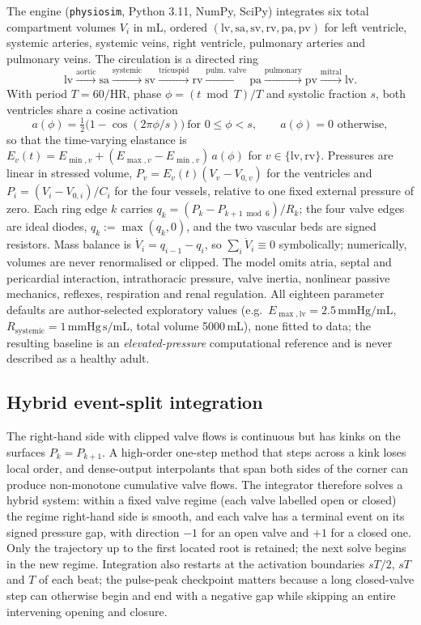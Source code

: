 \documentclass[11pt,letterpaper]{article}
\newcommand{\pkg}[1]{\texttt{#1}}
\newcommand{\mmHg}{\mathrm{mmHg}}
\newcommand{\mL}{\mathrm{mL}}
\begin{document}
The engine (\pkg{physiosim}, Python 3.11, NumPy, SciPy) integrates six total compartment volumes $V_i$ in mL, ordered $(\mathrm{lv},\mathrm{sa},\mathrm{sv},\mathrm{rv},\mathrm{pa},\mathrm{pv})$ for left ventricle, systemic arteries, systemic veins, right ventricle, pulmonary arteries and pulmonary veins. The circulation is a directed ring
\[
\mathrm{lv}\xrightarrow{\text{aortic}}\mathrm{sa}\xrightarrow{\text{systemic}}\mathrm{sv}\xrightarrow{\text{tricuspid}}\mathrm{rv}\xrightarrow{\text{pulm.\ valve}}\mathrm{pa}\xrightarrow{\text{pulmonary}}\mathrm{pv}\xrightarrow{\text{mitral}}\mathrm{lv}.
\]
With period $T=60/\mathrm{HR}$, phase $\phi=(t \bmod T)/T$ and systolic fraction $s$, both ventricles share a cosine activation
\begin{equation}
a(\phi)=\tfrac12\bigl(1-\cos(2\pi\phi/s)\bigr)\ \text{for } 0\le\phi<s,\qquad a(\phi)=0 \text{ otherwise},
\end{equation}
so that the time-varying elastance \citep{suga1973elastance} is $E_v(t)=E_{\min,v}+(E_{\max,v}-E_{\min,v})\,a(\phi)$ for $v\in\{\mathrm{lv},\mathrm{rv}\}$. Pressures are linear in stressed volume, $P_v=E_v(t)(V_v-V_{0,v})$ for the ventricles and $P_i=(V_i-V_{0,i})/C_i$ for the four vessels, relative to one fixed external pressure of zero. Each ring edge $k$ carries $q_k=(P_k-P_{k+1 \bmod 6})/R_k$; the four valve edges are ideal diodes, $q_k:=\max(q_k,0)$, and the two vascular beds are signed resistors. Mass balance is $\dot V_i=q_{i-1}-q_i$, so $\sum_i \dot V_i\equiv 0$ symbolically; numerically, volumes are never renormalised or clipped. The model omits atria, septal and pericardial interaction, intrathoracic pressure, valve inertia, nonlinear passive mechanics, reflexes, respiration and renal regulation. All eighteen parameter defaults are author-selected exploratory values (e.g.\ $E_{\max,\mathrm{lv}}=2.5\,\mmHg/\mL$, $R_{\mathrm{systemic}}=1\,\mmHg\,\mathrm{s}/\mL$, total volume 5000\,mL), none fitted to data; the resulting baseline is an \emph{elevated-pressure} computational reference and is never described as a healthy adult.

\subsection{Hybrid event-split integration}
\label{sec:hybrid}

The right-hand side with clipped valve flows is continuous but has kinks on the surfaces $P_k=P_{k+1}$. A high-order one-step method that steps across a kink loses local order, and dense-output interpolants that span both sides of the corner can produce non-monotone cumulative valve flows. The integrator therefore solves a hybrid system: within a fixed valve regime (each valve labelled open or closed) the regime right-hand side is smooth, and each valve has a terminal event on its signed pressure gap, with direction $-1$ for an open valve and $+1$ for a closed one. Only the trajectory up to the first located root is retained; the next solve begins in the new regime. Integration also restarts at the activation boundaries $sT/2$, $sT$ and $T$ of each beat; the pulse-peak checkpoint matters because a long closed-valve step can otherwise begin and end with a negative gap while skipping an entire intervening opening and closure.
\end{document}
